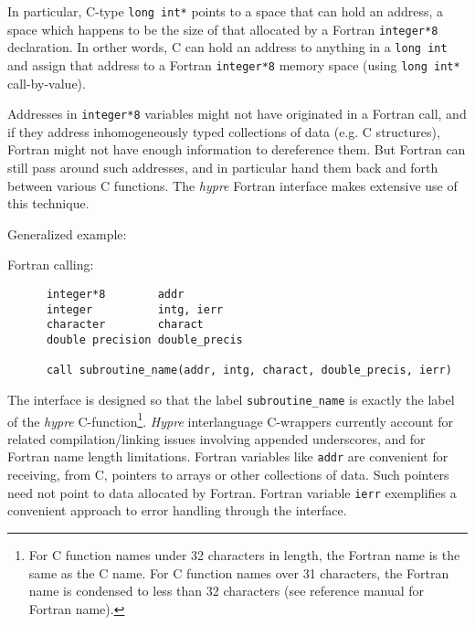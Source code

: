 \vspace{0.2in}

In particular, C-type
\verb+long int*+ points to a space that can hold an address, a space
which happens to be the size of that allocated by a Fortran
\verb+integer*8+ declaration.
In orther words, C can hold an address to anything in a \verb+long int+ and
assign that address to a Fortran \verb+integer*8+ memory space
(using \verb+long int*+ call-by-value).

Addresses in \verb+integer*8+ variables might not have originated
in a Fortran call, and if they address inhomogeneously typed collections
of data (e.g. C structures), Fortran might not have enough information to
dereference them.  But Fortran can still pass around such addresses, and in
particular hand them back and forth between various C functions.  The
{\slshape hypre} Fortran interface makes extensive use of this technique.

\vspace{0.1in}

\noindent Generalized example:

\vspace{0.1in}

  Fortran calling:
\begin{verbatim}
      integer*8        addr
      integer          intg, ierr
      character        charact
      double precision double_precis

      call subroutine_name(addr, intg, charact, double_precis, ierr)
\end{verbatim}

The interface is designed so that the label \verb+subroutine_name+ is exactly
the label of the {\slshape hypre} C-function\footnote{For C
function names under 32 characters in length, the Fortran name is the same
as the C name.  For C function names over 31 characters, the Fortran
name is condensed to less than 32 characters (see reference manual for
Fortran name).}.
{\slshape Hypre} interlanguage C-wrappers currently
account for related compilation/linking issues involving appended
underscores, and for Fortran name length limitations.
Fortran variables like \verb+addr+
are convenient for receiving, from C, pointers to arrays or other
collections of data.  Such pointers need not point to data allocated by
Fortran.  Fortran variable \verb+ierr+ exemplifies a convenient approach
to error handling through the interface.

\vspace{0.1in}

